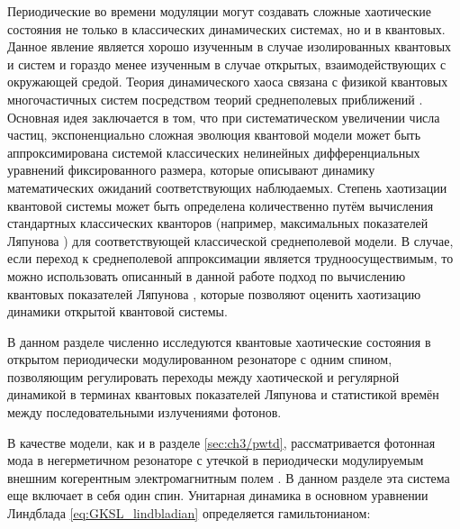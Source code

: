 Периодические во времени модуляции могут создавать сложные хаотические состояния не только в классических динамических системах, но и в квантовых. Данное явление является хорошо изученным в случае изолированных квантовых и систем и гораздо менее изученным в случае открытых, взаимодействующих с окружающей средой.
Теория динамического хаоса связана с физикой квантовых многочастичных систем посредством теорий среднеполевых приближений \cite{Spohn1980, Breuer2007}.
Основная идея заключается в том, что при систематическом увеличении числа частиц, экспоненциально сложная эволюция квантовой модели может быть аппроксимирована системой классических нелинейных дифференциальных уравнений фиксированного размера, которые описывают динамику математических ожиданий соответствующих наблюдаемых. 
Степень хаотизации квантовой системы может быть определена количественно путём вычисления стандартных классических кванторов (например, максимальных показателей Ляпунова \cite{ChavezCarlos2016, ChavezCarlos2019}) для соответствующей классической среднеполевой модели.
В случае, если переход к среднеполевой аппроксимации является трудноосуществимым, то можно использовать описанный в данной работе подход по вычислению квантовых показателей Ляпунова \cite{Yusipov2019_2}, которые позволяют оценить хаотизацию динамики открытой квантовой системы.

В данном разделе численно исследуются квантовые хаотические состояния в открытом периодически модулированном резонаторе с одним спином, позволяющим регулировать переходы между хаотической и регулярной динамикой в терминах квантовых показателей Ляпунова и статистикой времён между последовательными излучениями фотонов.

В качестве модели, как и в разделе \cref{sec:ch3/pwtd}, рассматривается фотонная мода в негерметичном резонаторе с утечкой в периодически модулируемым внешним когерентным электромагнитным полем \cite{Spiller1994, Brun1996}. В данном разделе эта система еще включает в себя один спин. Унитарная динамика в основном уравнении Линдблада \cref{eq:GKSL_lindbladian} определяется гамильтонианом:


